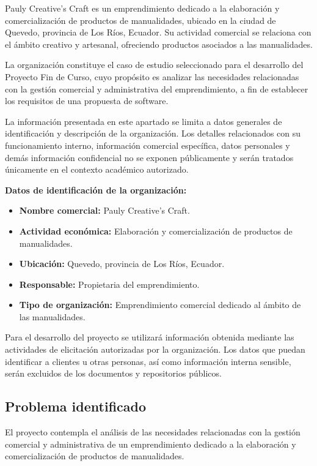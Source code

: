 \documentclass[11pt,a4paper]{article}
\begin{document}
	Pauly Creative's Craft es un emprendimiento dedicado a la elaboración y comercialización de productos de manualidades, ubicado en la ciudad de Quevedo, provincia de Los Ríos, Ecuador. Su actividad comercial se relaciona con el ámbito creativo y artesanal, ofreciendo productos asociados a las manualidades.
	
	La organización constituye el caso de estudio seleccionado para el desarrollo del Proyecto Fin de Curso, cuyo propósito es analizar las necesidades relacionadas con la gestión comercial y administrativa del emprendimiento, a fin de establecer los requisitos de una propuesta de software.
	
	La información presentada en este apartado se limita a datos generales de identificación y descripción de la organización. Los detalles relacionados con su funcionamiento interno, información comercial específica, datos personales y demás información confidencial no se exponen públicamente y serán tratados únicamente en el contexto académico autorizado.
	
	\textbf{Datos de identificación de la organización:}
	
	\begin{itemize}
		\item \textbf{Nombre comercial:} Pauly Creative's Craft.
		\item \textbf{Actividad económica:} Elaboración y comercialización de productos de manualidades.
		\item \textbf{Ubicación:} Quevedo, provincia de Los Ríos, Ecuador.
		\item \textbf{Responsable:} Propietaria del emprendimiento.
		\item \textbf{Tipo de organización:} Emprendimiento comercial dedicado al ámbito de las manualidades.
	\end{itemize}
	
	Para el desarrollo del proyecto se utilizará información obtenida mediante las actividades de elicitación autorizadas por la organización. Los datos que puedan identificar a clientes u otras personas, así como información interna sensible, serán excluidos de los documentos y repositorios públicos.
	
	\subsection{Problema identificado}
	
	El proyecto contempla el análisis de las necesidades relacionadas con la gestión comercial y administrativa de un emprendimiento dedicado a la elaboración y comercialización de productos de manualidades.
	
\end{document}

